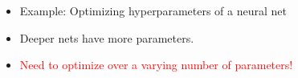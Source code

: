 \documentclass[landscape,a0b,final,a4resizeable]{include/a0poster}
\begin{document}
\begin{poster}
\large




\begin{multicols}{3}
%

\vspace{0.5in}

\begin{minipage}[c]{0.17\textwidth}
\begin{itemize}
	\item Example: Optimizing hyperparameters of a neural net
	\item Deeper nets have more parameters.
	\item \textcolor{red} {Need to optimize over a varying number of parameters!}
\end{itemize}
\end{minipage}
\begin{minipage}[c]{0.15\textwidth}
\begin{centering}
\begin{tabular}{c}
 \\
\end{tabular}
\end{centering}
\end{minipage}


\end{multicols}
\end{poster}
\end{document}
